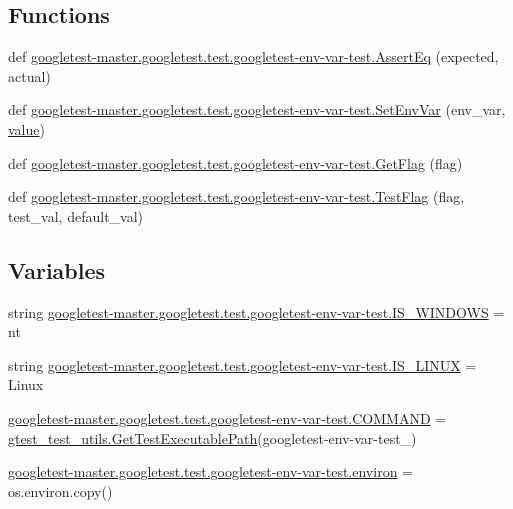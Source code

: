 \subsection*{Functions}
\begin{DoxyCompactItemize}
\item 
def \mbox{\hyperlink{namespacegoogletest-master_1_1googletest_1_1test_1_1googletest-env-var-test_a88fd4580c525aa618208816f96b531e6}{googletest-\/master.\+googletest.\+test.\+googletest-\/env-\/var-\/test.\+Assert\+Eq}} (expected, actual)
\item 
def \mbox{\hyperlink{namespacegoogletest-master_1_1googletest_1_1test_1_1googletest-env-var-test_ae1c40901908fb259a46549e0e12a6c8e}{googletest-\/master.\+googletest.\+test.\+googletest-\/env-\/var-\/test.\+Set\+Env\+Var}} (env\+\_\+var, \mbox{\hyperlink{_obj__test_2lib_2googletest-master_2googlemock_2test_2gmock-matchers__test_8cc_a337b8a670efc0b086ad3af163f3121b6}{value}})
\item 
def \mbox{\hyperlink{namespacegoogletest-master_1_1googletest_1_1test_1_1googletest-env-var-test_a2c8c4db62e68cc0fb4e121611cf01141}{googletest-\/master.\+googletest.\+test.\+googletest-\/env-\/var-\/test.\+Get\+Flag}} (flag)
\item 
def \mbox{\hyperlink{namespacegoogletest-master_1_1googletest_1_1test_1_1googletest-env-var-test_a8ac0bd902facc9bdf523902fc6ddc3d6}{googletest-\/master.\+googletest.\+test.\+googletest-\/env-\/var-\/test.\+Test\+Flag}} (flag, test\+\_\+val, default\+\_\+val)
\end{DoxyCompactItemize}
\subsection*{Variables}
\begin{DoxyCompactItemize}
\item 
string \mbox{\hyperlink{namespacegoogletest-master_1_1googletest_1_1test_1_1googletest-env-var-test_aff41eec48474456298e9f3a814cbe4ee}{googletest-\/master.\+googletest.\+test.\+googletest-\/env-\/var-\/test.\+I\+S\+\_\+\+W\+I\+N\+D\+O\+WS}} = \textquotesingle{}nt\textquotesingle{}
\item 
string \mbox{\hyperlink{namespacegoogletest-master_1_1googletest_1_1test_1_1googletest-env-var-test_a0956f3b01ed0aba69b372fb72407a097}{googletest-\/master.\+googletest.\+test.\+googletest-\/env-\/var-\/test.\+I\+S\+\_\+\+L\+I\+N\+UX}} = \textquotesingle{}Linux\textquotesingle{}
\item 
\mbox{\hyperlink{namespacegoogletest-master_1_1googletest_1_1test_1_1googletest-env-var-test_aa645736cb838d6559e6e5de6367db398}{googletest-\/master.\+googletest.\+test.\+googletest-\/env-\/var-\/test.\+C\+O\+M\+M\+A\+ND}} = \mbox{\hyperlink{namespacegtest__test__utils_a89ed3717984a80ffbb7a9c92f71b86a2}{gtest\+\_\+test\+\_\+utils.\+Get\+Test\+Executable\+Path}}(\textquotesingle{}googletest-\/env-\/var-\/test\+\_\+\textquotesingle{})
\item 
\mbox{\hyperlink{namespacegoogletest-master_1_1googletest_1_1test_1_1googletest-env-var-test_a8baf776191353c08f951bfd45503a61c}{googletest-\/master.\+googletest.\+test.\+googletest-\/env-\/var-\/test.\+environ}} = os.\+environ.\+copy()
\end{DoxyCompactItemize}
